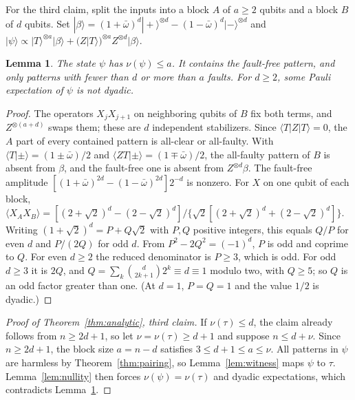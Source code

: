 \documentclass[aps,prl,reprint,twocolumn,amsmath,amssymb,floatfix,nofootinbib,superscriptaddress]{revtex4-2}
\newtheorem{lemma}[theorem]{Lemma}
\begin{document}
For the third claim, split the inputs into a block $A$ of $a\geq2$ qubits and a block $B$ of $d$ qubits. Set $|\beta\rangle=(1+\bar\omega)^d|{+}\rangle^{\otimes d}-(1-\bar\omega)^d|{-}\rangle^{\otimes d}$ and $|\psi\rangle\propto|T\rangle^{\otimes a}|\beta\rangle+(Z|T\rangle)^{\otimes a}Z^{\otimes d}|\beta\rangle$.
\begin{lemma}\label{lem:magicwitness}
The state $\psi$ has $\nu(\psi)\leq a$. It contains the fault-free pattern, and only patterns with fewer than $d$ or more than $a$ faults. For $d\geq2$, some Pauli expectation of $\psi$ is not dyadic.
\end{lemma}
\begin{proof}
The operators $X_jX_{j+1}$ on neighboring qubits of $B$ fix both terms, and $Z^{\otimes(a+d)}$ swaps them; these are $d$ independent stabilizers. Since $\langle T|Z|T\rangle=0$, the $A$ part of every contained pattern is all-clear or all-faulty. With $\langle T|{\pm}\rangle=(1\pm\bar\omega)/2$ and $\langle ZT|{\pm}\rangle=(1\mp\bar\omega)/2$, the all-faulty pattern of $B$ is absent from $\beta$, and the fault-free one is absent from $Z^{\otimes d}\beta$. The fault-free amplitude $[(1+\bar\omega)^{2d}-(1-\bar\omega)^{2d}]2^{-d}$ is nonzero. For $X$ on one qubit of each block, $\langle X_AX_B\rangle=[(2+\sqrt2)^d-(2-\sqrt2)^d]/\{\sqrt2[(2+\sqrt2)^d+(2-\sqrt2)^d]\}$. Writing $(1+\sqrt2)^d=P+Q\sqrt2$ with $P,Q$ positive integers, this equals $Q/P$ for even $d$ and $P/(2Q)$ for odd $d$. From $P^2-2Q^2=(-1)^d$, $P$ is odd and coprime to $Q$. For even $d\geq2$ the reduced denominator is $P\geq3$, which is odd. For odd $d\geq3$ it is $2Q$, and $Q=\sum_k\binom{d}{2k+1}2^k\equiv d\equiv1$ modulo two, with $Q\geq5$; so $Q$ is an odd factor greater than one. (At $d=1$, $P=Q=1$ and the value $1/2$ is dyadic.)
\end{proof}
\begin{proof}[Proof of Theorem~\ref{thm:analytic}, third claim]
If $\nu(\tau)\leq d$, the claim already follows from $n\geq2d+1$, so let $\nu=\nu(\tau)\geq d+1$ and suppose $n\leq d+\nu$. Since $n\geq2d+1$, the block size $a=n-d$ satisfies $3\leq d+1\leq a\leq\nu$. All patterns in $\psi$ are harmless by Theorem~\ref{thm:pairing}, so Lemma~\ref{lem:witness} maps $\psi$ to $\tau$. Lemma~\ref{lem:nullity} then forces $\nu(\psi)=\nu(\tau)$ and dyadic expectations, which contradicts Lemma~\ref{lem:magicwitness}.
\end{proof}
\end{document}
